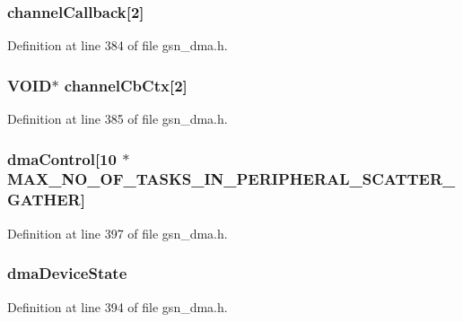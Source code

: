 \hypertarget{a00049_a87bff44e43568a32d78369cdd2ebb49e}{
\subsubsection[{channelCallback}]{ {\bf channelCallback}\mbox{[}2\mbox{]}}}
\label{a00049_a87bff44e43568a32d78369cdd2ebb49e}


Definition at line 384 of file gsn\_\-dma.h.

\hypertarget{a00049_a75f196cea4b3c0868b5580fa92a8ad5f}{
\subsubsection[{channelCbCtx}]{\setlength{\rightskip}{0pt plus 5cm}VOID$\ast$ {\bf channelCbCtx}\mbox{[}2\mbox{]}}}
\label{a00049_a75f196cea4b3c0868b5580fa92a8ad5f}


Definition at line 385 of file gsn\_\-dma.h.

\hypertarget{a00049_aef9027f3e52eb0793e06c4895858e86e}{
\subsubsection[{dmaControl}]{ {\bf dmaControl}\mbox{[}10 $\ast$MAX\_\-NO\_\-OF\_\-TASKS\_\-IN\_\-PERIPHERAL\_\-SCATTER\_\-GATHER\mbox{]}}}
\label{a00049_aef9027f3e52eb0793e06c4895858e86e}


Definition at line 397 of file gsn\_\-dma.h.

\hypertarget{a00049_a7238ebf9ce9010563ba1c1a3852df6b4}{
\subsubsection[{dmaDeviceState}]{ {\bf dmaDeviceState}}}
\label{a00049_a7238ebf9ce9010563ba1c1a3852df6b4}


Definition at line 394 of file gsn\_\-dma.h.

